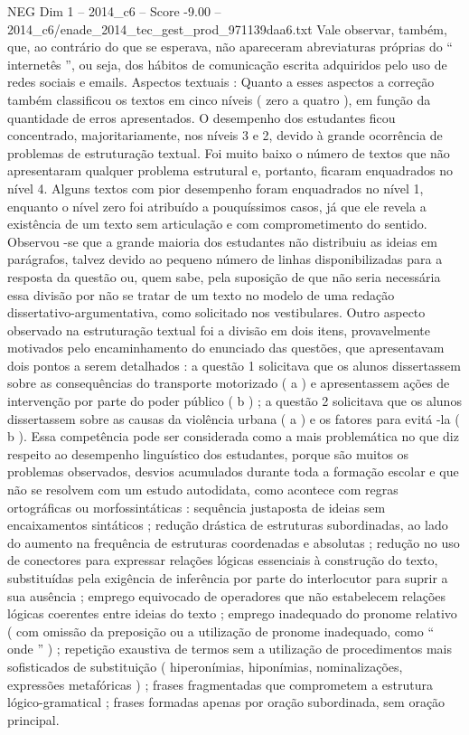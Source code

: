 \begin{textsample}{NEG Dim 1 – 2014\_c6 – Score -9.00 – 2014\_c6/enade\_2014\_tec\_gest\_prod\_971139daa6.txt}
Vale observar, também, que, ao contrário do que se esperava, não apareceram abreviaturas próprias do “ internetês ”, ou seja, dos hábitos de comunicação escrita adquiridos pelo uso de redes sociais e emails.
Aspectos textuais : Quanto a esses aspectos a correção também classificou os textos em cinco níveis ( zero a quatro ), em função da quantidade de erros apresentados.
O desempenho dos estudantes ficou concentrado, majoritariamente, nos níveis 3 e 2, devido à grande ocorrência de problemas de estruturação textual.
Foi muito baixo o número de textos que não apresentaram qualquer problema estrutural e, portanto, ficaram enquadrados no nível 4.
Alguns textos com pior desempenho foram enquadrados no nível 1, enquanto o nível zero foi atribuído a pouquíssimos casos, já que ele revela a existência de um texto sem articulação e com comprometimento do sentido.
Observou -se que a grande maioria dos estudantes não distribuiu as ideias em parágrafos, talvez devido ao pequeno número de linhas disponibilizadas para a resposta da questão ou, quem sabe, pela suposição de que não seria necessária essa divisão por não se tratar de um texto no modelo de uma redação dissertativo-argumentativa, como solicitado nos vestibulares.
Outro aspecto observado na estruturação textual foi a divisão em dois itens, provavelmente motivados pelo encaminhamento do enunciado das questões, que apresentavam dois pontos a serem detalhados : a questão 1 solicitava que os alunos dissertassem sobre as consequências do transporte motorizado ( a ) e apresentassem ações de intervenção por parte do poder público ( b ) ; a questão 2 solicitava que os alunos dissertassem sobre as causas da violência urbana ( a ) e os fatores para evitá -la ( b ).
Essa competência pode ser considerada como a mais problemática no que diz respeito ao desempenho linguístico dos estudantes, porque são muitos os problemas observados, desvios acumulados durante toda a formação escolar e que não se resolvem com um estudo autodidata, como acontece com regras ortográficas ou morfossintáticas : sequência justaposta de ideias sem encaixamentos sintáticos ; redução drástica de estruturas subordinadas, ao lado do aumento na frequência de estruturas coordenadas e absolutas ; redução no uso de conectores para expressar relações lógicas essenciais à construção do texto, substituídas pela exigência de inferência por parte do interlocutor para suprir a sua ausência ; emprego equivocado de operadores que não estabelecem relações lógicas coerentes entre ideias do texto ; emprego inadequado do pronome relativo ( com omissão da preposição ou a utilização de pronome inadequado, como “ onde ” ) ; repetição exaustiva de termos sem a utilização de procedimentos mais sofisticados de substituição ( hiperonímias, hiponímias, nominalizações, expressões metafóricas ) ; frases fragmentadas que comprometem a estrutura lógico-gramatical ; frases formadas apenas por oração subordinada, sem oração principal.

\end{textsample}
